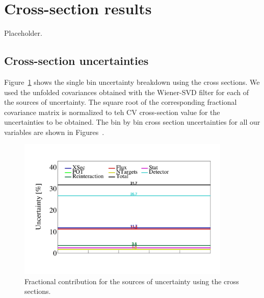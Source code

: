 \documentclass{article}
\begin{document}
\clearpage

\section{Cross-section results}
Placeholder.

\subsection{Cross-section uncertainties}

Figure~\ref{fig:single-bin-uncertainties-cross-sections} shows the single bin uncertainty breakdown 
using the cross sections. We used the unfolded covariances obtained with the Wiener-SVD filter 
for each of the sources of uncertainty. The square root of the corresponding fractional covariance 
matrix is normalized to teh CV cross-section value for the uncertainties to be obtained.
The bin by bin cross section uncertainties for all our variables are shown in
Figures~.

\begin{figure}[H]
    \centering 
    \includegraphics[width=4in]{../Figs/CAFAna/UnfBinUncertainties/EventCount.png}
    \caption{Fractional contribution for the sources of uncertainty using the cross sections.}
    \label{fig:single-bin-uncertainties-cross-sections}
\end{figure}
\end{document}
